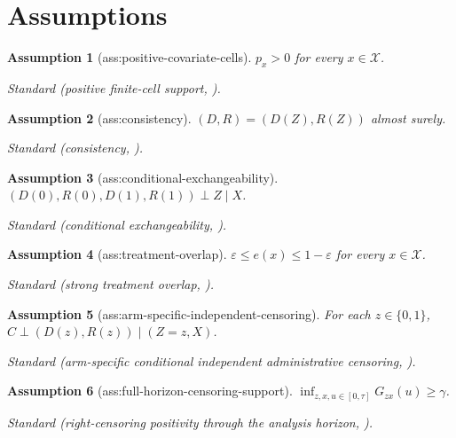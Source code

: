 \documentclass{article}
\newtheorem{assumption}{Assumption}
\begin{document}
\section{Assumptions}

\begin{assumption}[ass:positive-covariate-cells]\label{ass:positive-covariate-cells}
\(p_x>0\) for every \(x\in\mathcal X\).
\par\smallskip\noindent\emph{Standard} (positive finite-cell support, \cite{comment2025survivor}).
\end{assumption}

\begin{assumption}[ass:consistency]\label{ass:consistency}
\((D,R)=(D(Z),R(Z))\) almost surely.
\par\smallskip\noindent\emph{Standard} (consistency, \cite{comment2025survivor}).
\end{assumption}

\begin{assumption}[ass:conditional-exchangeability]\label{ass:conditional-exchangeability}
\((D(0),R(0),D(1),R(1))\perp Z\mid X\).
\par\smallskip\noindent\emph{Standard} (conditional exchangeability, \cite{comment2025survivor}).
\end{assumption}

\begin{assumption}[ass:treatment-overlap]\label{ass:treatment-overlap}
\(\varepsilon\le e(x)\le1-\varepsilon\) for every \(x\in\mathcal X\).
\par\smallskip\noindent\emph{Standard} (strong treatment overlap, \cite{comment2025survivor}).
\end{assumption}

\begin{assumption}[ass:arm-specific-independent-censoring]\label{ass:arm-specific-independent-censoring}
For each \(z\in\{0,1\}\), \(C\perp(D(z),R(z))\mid(Z=z,X)\).
\par\smallskip\noindent\emph{Standard} (arm-specific conditional independent administrative censoring, \cite{goldberg2019hoeffding}).
\end{assumption}

\begin{assumption}[ass:full-horizon-censoring-support]\label{ass:full-horizon-censoring-support}
\(\inf_{z,x,u\in[0,\tau]}G_{zx}(u)\ge\gamma\).
\par\smallskip\noindent\emph{Standard} (right-censoring positivity through the analysis horizon, \cite{goldberg2019hoeffding}).
\end{assumption}
\end{document}
